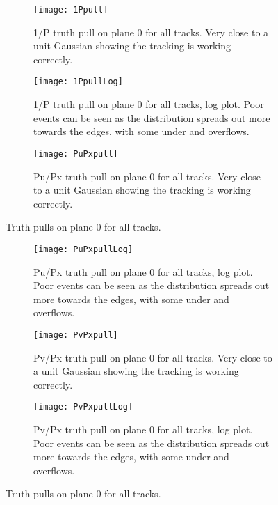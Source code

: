 \begin{figure}
    \centering
    \begin{subfigure}[]{0.65\textwidth}
        \centering
        \texttt{[image: 1Ppull]} 
        \caption{1/P truth pull on plane 0 for all tracks. Very close to a unit Gaussian showing the tracking is working correctly.}
    \end{subfigure}
    
    \begin{subfigure}[]{0.65\textwidth}
        \centering
        \texttt{[image: 1PpullLog]} 
        \caption{1/P truth pull on plane 0 for all tracks, log plot. Poor events can be seen as the distribution spreads out more towards the edges, with some under and overflows.}
    \end{subfigure}

    \begin{subfigure}[]{0.65\textwidth}
        \centering
        \texttt{[image: PuPxpull]} 
        \caption{Pu/Px truth pull on plane 0 for all tracks. Very close to a unit Gaussian showing the tracking is working correctly.}
    \end{subfigure}

    \caption{Truth pulls on plane 0 for all tracks.}
\end{figure}



\begin{figure}
    \centering
    \begin{subfigure}[]{0.65\textwidth}
        \centering
        \texttt{[image: PuPxpullLog]} 
        \caption{Pu/Px truth pull on plane 0 for all tracks, log plot. Poor events can be seen as the distribution spreads out more towards the edges, with some under and overflows.}
    \end{subfigure}
    
    \begin{subfigure}[]{0.65\textwidth}
        \centering
        \texttt{[image: PvPxpull]} 
        \caption{Pv/Px truth pull on plane 0 for all tracks. Very close to a unit Gaussian showing the tracking is working correctly.}
    \end{subfigure}

    \begin{subfigure}[]{0.65\textwidth}
        \centering
        \texttt{[image: PvPxpullLog]} 
        \caption{Pv/Px truth pull on plane 0 for all tracks, log plot. Poor events can be seen as the distribution spreads out more towards the edges, with some under and overflows.}
    \end{subfigure}

    \caption{Truth pulls on plane 0 for all tracks.}
\end{figure}



